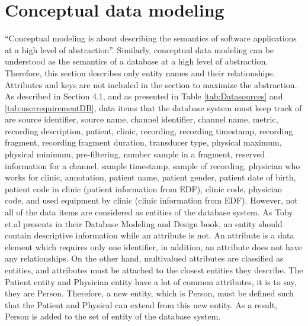 \section{Conceptual data modeling}
“Conceptual modeling is about describing the semantics of software applications at a high level of abstraction”\cite{CONCEPTUAL_BOOK}. Similarly, conceptual data modeling can be understood as the semantics of a database at a high level of abstraction. Therefore, this section describes only entity names and their relationships. Attributes and keys are not included in the section to maximize the abstraction. As described in Section 4.1, and as presented in Table \ref{tab:Datasources} and \ref{tab:userrequirementDB}, data items that the database system must keep track of are source identifier, source name, channel identifier, channel name, metric, recording description, patient, clinic, recording, recording timestamp, recording fragment, recording fragment duration, transducer type, physical maximum, physical minimum, pre-filtering, number sample in a fragment, reserved information for a channel, sample timestamp, sample of recording, physician who works for clinic, annotation, patient name, patient gender, patient date of birth, patient code in clinic (patient information from EDF), clinic code, physician code, and used equipment by clinic (clinic information from EDF). However, not all of the data items are considered as entities of the database system. As Toby et.al\cite{DATABASEMODELING_BOOK} presents in their Database Modeling and Design book, an entity should contain descriptive information while an attribute is not. An attribute is a data element which requires only one identifier, in addition, an attribute does not have any relationships. On the other hand, multivalued attributes are classified as entities, and attributes must be attached to the closest entities they describe. The Patient entity and Physician entity have a lot of common attributes, it is to say, they are Person. Therefore, a new entity, which is Person, must be defined such that the Patient and Physical can extend from this new entity. As a result, Person is added to the set of entity of the database system.\\
